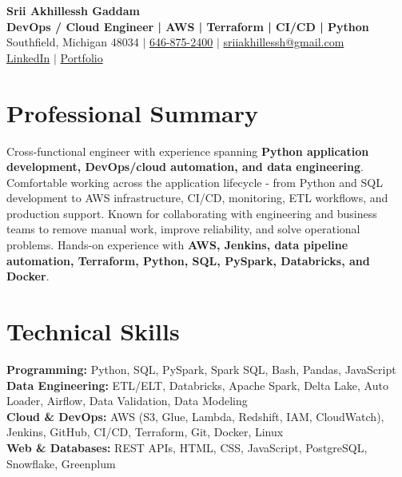 \documentclass[letterpaper,10pt]{article}
\begin{document}
\fontsize{9.35pt}{10.45pt}\selectfont

\begin{center}
    {\LARGE \textbf{Srii Akhillessh Gaddam}} \\[-1pt]
    \textbf{DevOps / Cloud Engineer | AWS | Terraform | CI/CD | Python} \\[2pt]
    Southfield, Michigan 48034 $|$
    \href{tel:6468752400}{646-875-2400} $|$
    \href{mailto:sriiakhillessh@gmail.com}{sriiakhillessh@gmail.com} \\[1pt]
    \href{https://www.linkedin.com/in/srii-akhiilessh-gaddam-b48668191/}{LinkedIn} $|$
    \href{https://sriiakhillesshg.github.io/portfolio/}{Portfolio}
\end{center}
\vspace{-8pt}

\section{Professional Summary}
\small{Cross-functional engineer with experience spanning \textbf{Python application development, DevOps/cloud automation, and data engineering}. Comfortable working across the application lifecycle - from Python and SQL development to AWS infrastructure, CI/CD, monitoring, ETL workflows, and production support. Known for collaborating with engineering and business teams to remove manual work, improve reliability, and solve operational problems. Hands-on experience with \textbf{AWS, Jenkins, data pipeline automation, Terraform, Python, SQL, PySpark, Databricks, and Docker}.}

\section{Technical Skills}
\small{
\textbf{Programming:} Python, SQL, PySpark, Spark SQL, Bash, Pandas, JavaScript \\
\textbf{Data Engineering:} ETL/ELT, Databricks, Apache Spark, Delta Lake, Auto Loader, Airflow, Data Validation, Data Modeling \\
\textbf{Cloud \& DevOps:} AWS (S3, Glue, Lambda, Redshift, IAM, CloudWatch), Jenkins, GitHub, CI/CD, Terraform, Git, Docker, Linux \\
\textbf{Web \& Databases:} REST APIs, HTML, CSS, JavaScript, PostgreSQL, Snowflake, Greenplum
}
\end{document}
